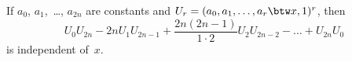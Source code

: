 If $a_{0}$, $a_{1}$,~\dots, $a_{2n}$ are constants and $U_{r} = (a_{0}, a_{1}, \dots, a_{r} \btw x, 1)^{r}$, then
\[
U_{0}U_{2n} - 2nU_{1}U_{2n-1}
  + \frac{2n(2n - 1)}{1·2} U_{2}U_{2n-2} - \dots + U_{2n}U_{0}
\]
is independent of~$x$. 

